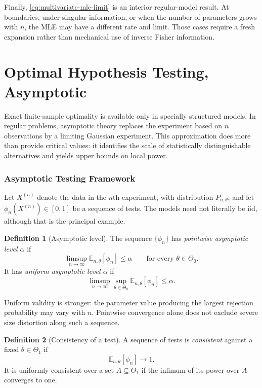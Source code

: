 \documentclass[12pt,oneside]{book}
\numberwithin{equation}{section}
\theoremstyle{definition}
\newtheorem{definition}{Definition}[section]
\theoremstyle{plain}
\theoremstyle{remark}
\newcommand{\E}{\mathbb{E}}
\begin{document}
Finally, \eqref{eq:multivariate-mle-limit} is an interior regular-model
result.  At boundaries, under singular information, or when the number of
parameters grows with $n$, the MLE may have a different rate and limit.
Those cases require a fresh expansion rather than mechanical use of inverse
Fisher information.

\part{Optimal Hypothesis Testing, Asymptotic}

Exact finite-sample optimality is available only in specially structured
models.  In regular problems, asymptotic theory replaces the experiment based
on $n$ observations by a limiting Gaussian experiment.  This approximation
does more than provide critical values: it identifies the scale of
statistically distinguishable alternatives and yields upper bounds on local
power.

\section{Asymptotic Testing Framework}

Let $X^{(n)}$ denote the data in the $n$th experiment, with distribution
$P_{n,\theta}$, and let $\phi_n(X^{(n)})\in[0,1]$ be a sequence of tests.  The
models need not literally be iid, although that is the principal example.

\begin{definition}[Asymptotic level]
The sequence $\{\phi_n\}$ has \emph{pointwise asymptotic level $\alpha$} if
\[
    \limsup_{n\to\infty}\E_{n,\theta}[\phi_n]\leq\alpha
    \qquad\text{for every }\theta\in\Theta_0.
\]
It has \emph{uniform asymptotic level $\alpha$} if
\begin{equation}
    \limsup_{n\to\infty}
    \sup_{\theta\in\Theta_0}\E_{n,\theta}[\phi_n]
    \leq\alpha.
    \label{eq:uniform-asymptotic-level}
\end{equation}
\end{definition}

Uniform validity is stronger: the parameter value producing the largest
rejection probability may vary with $n$.  Pointwise convergence alone does
not exclude severe size distortion along such a sequence.

\begin{definition}[Consistency of a test]
A sequence of tests is \emph{consistent} against a fixed
$\theta\in\Theta_1$ if
\[
    \E_{n,\theta}[\phi_n]\longrightarrow1.
\]
It is uniformly consistent over a set $A\subseteq\Theta_1$ if the infimum of
its power over $A$ converges to one.
\end{definition}
\end{document}

